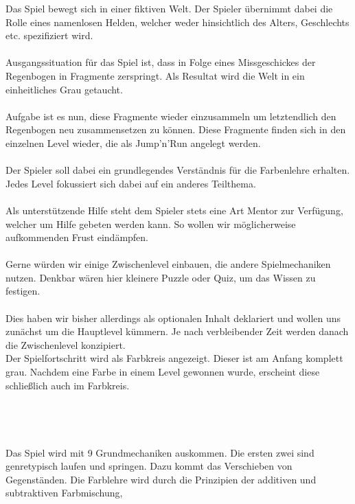 \documentclass[10pt,a4paper,notitlepage]{report}
\begin{document}
		Das Spiel bewegt sich in einer fiktiven Welt. Der Spieler übernimmt dabei die Rolle eines namenlosen Helden, 
	welcher weder hinsichtlich des Alters, Geschlechts etc. spezifiziert wird.\\\\
	Ausgangssituation für das Spiel ist, dass in Folge eines Missgeschickes der Regenbogen in Fragmente zerspringt.
	Als Resultat wird die Welt in ein einheitliches Grau getaucht.\\\\
	Aufgabe ist es nun, diese Fragmente wieder einzusammeln um letztendlich den Regenbogen neu zusammensetzen zu können. 
	Diese Fragmente finden sich in den einzelnen Level wieder, die als Jump'n'Run angelegt werden.\\\\
	Der Spieler soll dabei ein grundlegendes Verständnis für die Farbenlehre erhalten. Jedes Level fokussiert sich dabei auf ein anderes Teilthema.\\\\
	Als unterstützende Hilfe steht dem Spieler stets eine Art Mentor zur Verfügung, welcher um Hilfe gebeten werden kann. 
	So wollen wir möglicherweise aufkommenden Frust eindämpfen.\\\\
	Gerne würden wir einige Zwischenlevel einbauen, die andere Spielmechaniken nutzen. 
	Denkbar wären hier kleinere Puzzle oder Quiz, um das Wissen zu festigen. \\\\
	Dies haben wir bisher allerdings als optionalen Inhalt deklariert und wollen uns zunächst um die Hauptlevel kümmern. 
	Je nach verbleibender Zeit werden danach die Zwischenlevel konzipiert.\\
	Der Spielfortschritt wird als Farbkreis angezeigt. Dieser ist am Anfang komplett grau. Nachdem eine Farbe in einem Level gewonnen wurde,
	erscheint diese schließlich auch im Farbkreis.
	\\
	\\
	\clearpage\
	\marginpar{\vspace{3.0mm} \color{orange}\rule{0.8mm}{53.3mm} \\[3mm] \color{hellorange}\rule{0.8mm}{170mm}}
	\\
	\\
	\\
	\Text
		Das Spiel wird mit 9 Grundmechaniken auskommen. Die ersten zwei sind genretypisch laufen und springen. 
	Dazu kommt das Verschieben von Gegenständen. Die Farblehre wird durch die Prinzipien der additiven und subtraktiven Farbmischung, 
\end{document}
